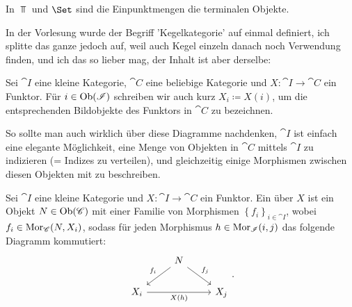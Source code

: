 \begin{example}
    In $\Top$ und  $\Set$ sind die Einpunktmengen die terminalen Objekte.
\end{example}

\begin{remark*}
    In der Vorlesung wurde der Begriff 'Kegelkategorie' auf einmal definiert, ich splitte das ganze jedoch auf, weil auch Kegel einzeln danach noch Verwendung finden, und ich das so lieber mag, der Inhalt ist aber derselbe:
\end{remark*}

\begin{dabuse}
    Sei $\cat{I}$ eine kleine Kategorie, $\cat{C}$ eine beliebige Kategorie und $X\colon  \cat{I} \to  \cat{C}$ ein Funktor. Für $i\in \operatorname{Ob}(\mathscr{I})$ schreiben wir auch kurz $X_i \coloneqq  X(i)$, um die entsprechenden Bildobjekte des Funktors in $\cat{C}$ zu bezeichnen.
\end{dabuse}

\begin{remark*}
    So sollte man auch wirklich über diese Diagramme nachdenken, $\cat{I}$ ist einfach eine elegante Möglichkeit, eine Menge von Objekten in $\cat{C}$ mittels $\cat{I}$ zu indizieren (= Indizes zu verteilen), und gleichzeitig einige Morphismen zwischen diesen Objekten mit zu beschreiben.
\end{remark*}

\begin{definition**}[Kegel]\label{def:kegel}
    Sei $\cat{I}$ eine kleine Kategorie und $X: \cat{I} \to  \cat{C}$ ein Funktor. Ein  über $X$ ist ein Objekt $N\in \operatorname{Ob}(\mathscr{C})$ mit einer Familie von Morphismen $\left \{f_i\right\} _{i\in \cat{I}}$, wobei $f_i \in  \operatorname{Mor}_{\mathscr{C}}(N, X_i)$, sodass für jeden Morphismus $h\in \operatorname{Mor}_{\mathscr{I}}(i,j)$ das folgende Diagramm kommutiert:
    \[
    \begin{tikzcd}
        & N \ar[swap]{dl}{f_i} \ar{dr}{f_j} \\
        X_i \ar[swap]{rr}{X(h)} & & X_j
    \end{tikzcd}
    .\] 
\end{definition**}

